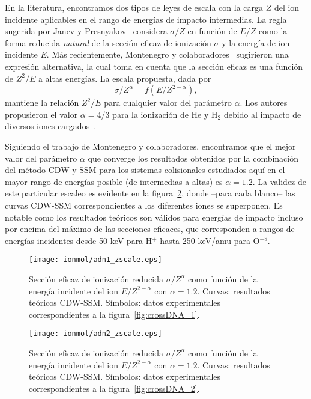 En la literatura, encontramos dos tipos de leyes de escala con la carga 
$Z$ del ion incidente aplicables en el rango de energías de impacto
intermedias. La regla sugerida por Janev y Presnyakov~\cite{Janev:80} 
considera $\sigma/Z$ en función de $E/Z$ como la forma reducida 
\textit{natural} de la sección eficaz de ionización $\sigma$ y la energía
de ion incidente $E$. Más recientemente, Montenegro y 
colaboradores~\cite{Dubois:13,Montenegro:13} sugirieron una expresión
alternativa, la cual toma en cuenta que la sección eficaz es una función
de $Z^2/E$ a altas energías. La escala propuesta, dada por
\begin{equation}
 \sigma/Z^{\alpha}=f(E/Z^{2-\alpha}),
\label{eq:Montenegro}
\end{equation}
mantiene la relación $Z^2/E$ para cualquier valor del parámetro $\alpha$. 
Los autores propusieron el valor $\alpha=4/3$ para la ionización de He y
H$_2$ debido al impacto de diversos iones cargados~\cite{dubois2013}. 

Siguiendo el trabajo de Montenegro y colaboradores, encontramos que el
mejor valor del parámetro $\alpha$ que converge los resultados obtenidos
por la combinación del método CDW y SSM para los sistemas colisionales
estudiados aquí en el mayor rango de energías posible (de intermedias a 
altas) es $\alpha=1.2$. La validez de este particular escaleo es evidente
en la figura~\ref{fig:zreduced}, donde --para cada blanco-- las curvas 
CDW-SSM correspondientes a los diferentes iones se superponen. Es notable
como los resultados teóricos son válidos para energías de impacto incluso
por encima del máximo de las secciones eficaces, que corresponden a
rangos de energías incidentes desde 50 keV para H$^+$ hasta 250 keV/amu 
para O$^{+8}$.

\begin{figure}
\centering
\texttt{[image: ionmol/adn1\_zscale.eps]}
\caption[Sección eficaz de ionización reducida por $Z$ y $\alpha$ 
(Parte I).]
{Sección eficaz de ionización reducida $\sigma/Z^{\alpha}$ como función
de la energía incidente del ion $E/Z^{2-\alpha}$ con $\alpha=1.2$. 
Curvas: resultados teóricos CDW-SSM. 
Símbolos: datos experimentales correspondientes a la 
figura~\ref{fig:crossDNA_1}.}
\label{fig:zreduced}
\end{figure} 

\begin{figure}
\centering
\texttt{[image: ionmol/adn2\_zscale.eps]}
\caption[Sección eficaz de ionización reducida por $Z$ y $\alpha$ 
(Parte II).]
{Sección eficaz de ionización reducida $\sigma/Z^{\alpha}$ como función
de la energía incidente del ion $E/Z^{2-\alpha}$ con $\alpha=1.2$. 
Curvas: resultados teóricos CDW-SSM. 
Símbolos: datos experimentales correspondientes a la 
figura~\ref{fig:crossDNA_2}.}
\label{fig:zreduced}
\end{figure} 

